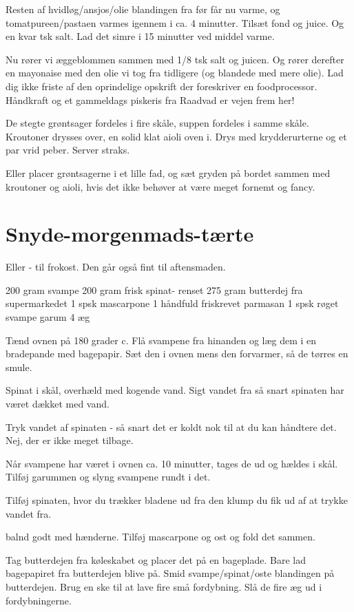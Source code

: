 \documentclass[
]{book}
\begin{document}
Resten af hvidløg/ansjos/olie blandingen fra før får nu varme, og tomatpureen/pastaen
varmes igennem i ca. 4 minutter. Tilsæt fond og juice. Og en kvar tsk salt.
Lad det simre i 15 minutter ved middel varme.

Nu rører vi æggeblommen sammen med 1/8 tsk salt og juicen. Og rører derefter
en mayonaise med den olie vi tog fra tidligere (og blandede med mere olie).
Lad dig ikke friste af den oprindelige opskrift der foreskriver en foodprocessor.
Håndkraft og et gammeldags piskeris fra Raadvad er vejen frem her!

De stegte grøntsager fordeles i fire skåle,
suppen fordeles i samme skåle. Kroutoner drysses over, en solid klat aioli oven i.
Drys med krydderurterne og et par vrid peber. Server straks.

Eller placer grøntsagerne i et lille fad, og sæt gryden på bordet sammen med
kroutoner og aioli, hvis det ikke behøver at være meget fornemt og fancy.

\chapter{Snyde-morgenmads-tærte}\label{snyde-morgenmads-tuxe6rte}

Eller - til frokost. Den går også fint til aftensmaden.

200 gram svampe
200 gram frisk spinat- renset
275 gram butterdej fra supermarkedet
1 spsk mascarpone
1 håndfuld friskrevet parmasan
1 spsk røget svampe garum
4 æg

Tænd ovnen på 180 grader c.
Flå svampene fra hinanden og læg dem i en bradepande med
bagepapir. Sæt den i ovnen mens den forvarmer, så de
tørres en smule.

Spinat i skål, overhæld med kogende vand. Sigt vandet fra så
snart spinaten har været dækket med vand.

Tryk vandet af spinaten - så snart det er koldt nok til at
du kan håndtere det. Nej, der er ikke meget tilbage.

Når svampene har været i ovnen ca. 10 minutter, tages de ud
og hældes i skål. Tilføj garummen og slyng svampene rundt i det.

Tilføj spinaten, hvor du trækker bladene ud fra den klump du
fik ud af at trykke vandet fra.

balnd godt med hænderne. Tilføj mascarpone og ost og fold det
sammen.

Tag butterdejen fra køleskabet og placer det på en bageplade.
Bare lad bagepapiret fra butterdejen blive på.
Smid svampe/spinat/oste blandingen på butterdejen. Brug en
ske til at lave fire små fordybning. Slå de fire æg ud i
fordybningerne.
\end{document}
